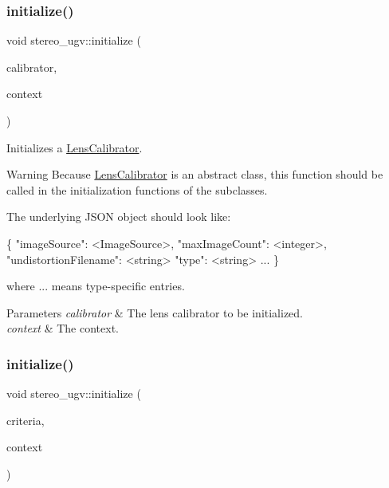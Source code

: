 \subsubsection{\texorpdfstring{initialize()}{initialize()}\hspace{0.1cm}{\footnotesize\ttfamily [5/8]}}
{\footnotesize\ttfamily void stereo\+\_\+ugv\+::initialize (\begin{DoxyParamCaption}\item[{\hyperlink{classstereo__ugv_1_1LensCalibrator}{Lens\+Calibrator} $\ast$}]{calibrator,  }\item[{const \hyperlink{classstereo__ugv_1_1Context}{Context} \&}]{context }\end{DoxyParamCaption})}



Initializes a \hyperlink{classstereo__ugv_1_1LensCalibrator}{Lens\+Calibrator}. 

\begin{DoxyWarning}{Warning}
Because \hyperlink{classstereo__ugv_1_1LensCalibrator}{Lens\+Calibrator} is an abstract class, this function should be called in the initialization functions of the subclasses.
\end{DoxyWarning}
The underlying J\+S\+ON object should look like\+: 
\begin{DoxyCode}
\{
  \textcolor{stringliteral}{"imageSource"}: <ImageSource>,
  \textcolor{stringliteral}{"maxImageCount"}: <integer>,
  \textcolor{stringliteral}{"undistortionFilename"}: <\textcolor{keywordtype}{string}>
  \textcolor{stringliteral}{"type"}: <\textcolor{keywordtype}{string}>
  ...
\}
\end{DoxyCode}
 where ... means type-\/specific entries. 
\begin{DoxyParams}{Parameters}
{\em calibrator} & The lens calibrator to be initialized. \\
\hline
{\em context} & The context. \\
\hline
\end{DoxyParams}
\mbox{\label{namespacestereo__ugv_a0a98148c84d1f085ac51c2f2fb7c8e7a}} 
\subsubsection{\texorpdfstring{initialize()}{initialize()}\hspace{0.1cm}{\footnotesize\ttfamily [6/8]}}
{\footnotesize\ttfamily void stereo\+\_\+ugv\+::initialize (\begin{DoxyParamCaption}\item[{cv\+::\+Term\+Criteria $\ast$}]{criteria,  }\item[{const \hyperlink{classstereo__ugv_1_1Context}{Context} \&}]{context }\end{DoxyParamCaption})}



